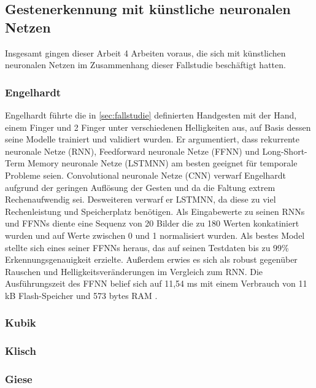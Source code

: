 \subsection{Gestenerkennung mit künstliche neuronalen Netzen}
Insgesamt gingen dieser Arbeit 4 Arbeiten voraus, die sich mit künstlichen neuronalen Netzen im Zusammenhang dieser Fallstudie beschäftigt hatten.

\subsubsection{Engelhardt}
Engelhardt führte die in \ref{sec:fallstudie} definierten Handgesten mit der Hand, einem Finger und 2 Finger unter verschiedenen Helligkeiten aus, auf Basis dessen seine Modelle trainiert und validiert wurden. Er
argumentiert, dass rekurrente neuronale Netze (RNN), Feedforward neuronale Netze (FFNN) und Long-Short-Term Memory neuronale Netze (LSTMNN) am besten geeignet für temporale Probleme seien. Convolutional neuronale
Netze (CNN) verwarf Engelhardt aufgrund der geringen Auflösung der Gesten und da die Faltung extrem Rechenaufwendig sei. Desweiteren verwarf er LSTMNN, da diese zu viel Rechenleistung und Speicherplatz
benötigen. Als Eingabewerte zu seinen RNNs und FFNNs diente eine Sequenz von 20 Bilder die zu 180 Werten konkatiniert wurden und auf Werte zwischen 0 und 1 normalisiert wurden. Als bestes Model stellte sich eines
seiner FFNNs heraus, das auf seinen Testdaten bis zu 99\% Erkennungsgenauigkeit erzielte. Außerdem erwies es sich als robust gegenüber Rauschen und Helligkeitsveränderungen im Vergleich zum RNN. Die Ausführungszeit
des FFNN belief sich auf 11,54 ms mit einem Verbrauch von 11 kB Flash-Speicher und 573 bytes RAM \cite{engelhardtThesis}.

\subsubsection{Kubik}

\subsubsection{Klisch}

\subsubsection{Giese}